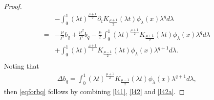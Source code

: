 \documentclass[review]{elsarticle}
\newtheorem{proof}{Proof}[section]
\begin{document}
\begin{proof}
\begin{equation}
\begin{aligned}
&-\int_0^1(\lambda t)^{\frac{\mu+1}{2}}\partial_tK_{\frac{\mu+1}{2}}(\lambda t)\phi_\lambda(x)\lambda^{q}d\lambda\\
=&-\frac{\mu}{t^2}b_q+\frac{\mu^2}{t^2}b_q-\frac{\mu}t\int_0^1(\lambda t)^{\frac{\mu+1}{2}}K_{\frac{\mu+1}{2}}(\lambda t)\phi_\lambda(x)\lambda^{q}d\lambda\\
&+\int_0^1(\lambda t)^{\frac{\mu+1}{2}}K_{\frac{\mu-1}{2}}(\lambda t)\phi_\lambda(x)\lambda^{q+1}d\lambda.\\
\end{aligned}
\end{equation}
Noting that
\begin{equation}\label{l42a}
\begin{aligned}
\Delta b_q=\int_0^1(\lambda t)^{\frac{\mu+1}{2}}K_{\frac{\mu-1}{2}}(\lambda t)\phi_\lambda(x)\lambda^{q+1}d\lambda,
\end{aligned}
\end{equation}
then \eqref{eqforbq} follows by combining \eqref{l41}, \eqref{l42} and \eqref{l42a}.


\end{proof}
\end{document}
